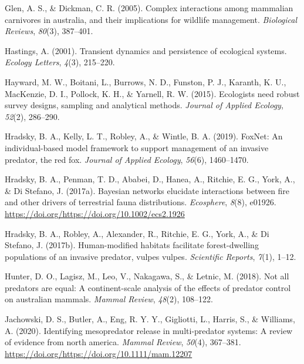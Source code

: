 \documentclass[]{elsarticle} %
\begin{document}
\leavevmode\hypertarget{ref-glen2005}{}%
Glen, A. S., \& Dickman, C. R. (2005). Complex interactions among mammalian carnivores in australia, and their implications for wildlife management. \emph{Biological Reviews}, \emph{80}(3), 387--401.

\leavevmode\hypertarget{ref-hastings2001}{}%
Hastings, A. (2001). Transient dynamics and persistence of ecological systems. \emph{Ecology Letters}, \emph{4}(3), 215--220.

\leavevmode\hypertarget{ref-hayward2015}{}%
Hayward, M. W., Boitani, L., Burrows, N. D., Funston, P. J., Karanth, K. U., MacKenzie, D. I., Pollock, K. H., \& Yarnell, R. W. (2015). Ecologists need robust survey designs, sampling and analytical methods. \emph{Journal of Applied Ecology}, \emph{52}(2), 286--290.

\leavevmode\hypertarget{ref-hradsky2019foxnet}{}%
Hradsky, B. A., Kelly, L. T., Robley, A., \& Wintle, B. A. (2019). FoxNet: An individual-based model framework to support management of an invasive predator, the red fox. \emph{Journal of Applied Ecology}, \emph{56}(6), 1460--1470.

\leavevmode\hypertarget{ref-https:ux2fux2fdoi.orgux2f10.1002ux2fecs2.1926}{}%
Hradsky, B. A., Penman, T. D., Ababei, D., Hanea, A., Ritchie, E. G., York, A., \& Di Stefano, J. (2017a). Bayesian networks elucidate interactions between fire and other drivers of terrestrial fauna distributions. \emph{Ecosphere}, \emph{8}(8), e01926. \url{https://doi.org/https://doi.org/10.1002/ecs2.1926}

\leavevmode\hypertarget{ref-hradsky2017human}{}%
Hradsky, B. A., Robley, A., Alexander, R., Ritchie, E. G., York, A., \& Di Stefano, J. (2017b). Human-modified habitats facilitate forest-dwelling populations of an invasive predator, vulpes vulpes. \emph{Scientific Reports}, \emph{7}(1), 1--12.

\leavevmode\hypertarget{ref-hunter2018}{}%
Hunter, D. O., Lagisz, M., Leo, V., Nakagawa, S., \& Letnic, M. (2018). Not all predators are equal: A continent-scale analysis of the effects of predator control on australian mammals. \emph{Mammal Review}, \emph{48}(2), 108--122.

\leavevmode\hypertarget{ref-https:ux2fux2fdoi.orgux2f10.1111ux2fmam.12207}{}%
Jachowski, D. S., Butler, A., Eng, R. Y. Y., Gigliotti, L., Harris, S., \& Williams, A. (2020). Identifying mesopredator release in multi-predator systems: A review of evidence from north america. \emph{Mammal Review}, \emph{50}(4), 367--381. \url{https://doi.org/https://doi.org/10.1111/mam.12207}
\end{document}
